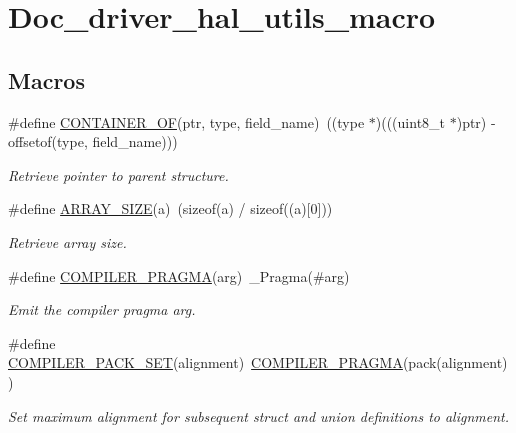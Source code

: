\hypertarget{group__doc__driver__hal__utils__macro}{}\section{Doc\+\_\+driver\+\_\+hal\+\_\+utils\+\_\+macro}
\label{group__doc__driver__hal__utils__macro}
\subsection*{Macros}
\begin{DoxyCompactItemize}
\item 
\#define \hyperlink{group__doc__driver__hal__utils__macro_gae5f8e0a04e100a3953e38a3c7bdbc4f4}{C\+O\+N\+T\+A\+I\+N\+E\+R\+\_\+\+OF}(ptr,  type,  field\+\_\+name)~((type $\ast$)(((uint8\+\_\+t $\ast$)ptr) -\/ offsetof(type, field\+\_\+name)))
\begin{DoxyCompactList}\small\item\em Retrieve pointer to parent structure. \end{DoxyCompactList}\item 
\#define \hyperlink{group__doc__driver__hal__utils__macro_ga25f003de16c08a4888b69f619d70f427}{A\+R\+R\+A\+Y\+\_\+\+S\+I\+ZE}(a)~(sizeof(a) / sizeof((a)\mbox{[}0\mbox{]}))
\begin{DoxyCompactList}\small\item\em Retrieve array size. \end{DoxyCompactList}\item 
\#define \hyperlink{group__doc__driver__hal__utils__macro_ga85a3ab5701281268521f109ed0078668}{C\+O\+M\+P\+I\+L\+E\+R\+\_\+\+P\+R\+A\+G\+MA}(arg)~\+\_\+\+Pragma(\#arg)
\begin{DoxyCompactList}\small\item\em Emit the compiler pragma {\itshape arg}. \end{DoxyCompactList}\item 
\#define \hyperlink{group__doc__driver__hal__utils__macro_gae2c02ff865ca6538b4b1bddbf2a6876c}{C\+O\+M\+P\+I\+L\+E\+R\+\_\+\+P\+A\+C\+K\+\_\+\+S\+ET}(alignment)~\hyperlink{group__doc__driver__hal__utils__macro_ga85a3ab5701281268521f109ed0078668}{C\+O\+M\+P\+I\+L\+E\+R\+\_\+\+P\+R\+A\+G\+MA}(pack(alignment))
\begin{DoxyCompactList}\small\item\em Set maximum alignment for subsequent struct and union definitions to {\itshape alignment}. \end{DoxyCompactList}\item 

\end{DoxyCompactItemize}
